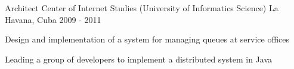 \begin{cventries}
\cventry
{Architect} %
{Center of Internet Studies (University of Informatics Science)} %
{La Havana, Cuba} %
{2009 - 2011} %
{ %
\begin{cvitems}
\item {Design and implementation of a system for managing queues at service offices}
\item {Leading a group of developers to implement a distributed system in Java}
\end{cvitems}
}


\end{cventries}
